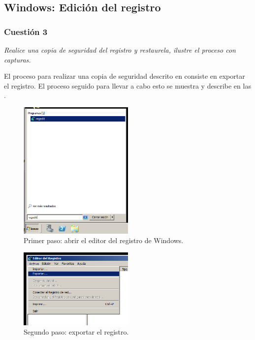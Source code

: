 \subsection{Windows: Edición del registro}
\subsubsection{Cuestión 3}
\textit{Realice una copia de seguridad del registro y restaurela, ilustre el proceso con capturas.}

El proceso para realizar una copia de seguridad descrito en consiste en exportar el registro. \cite{bac} El proceso seguido para llevar a cabo esto se muestra y describe en las .
\begin{figure}[H]
  \begin{center}
    \includegraphics[width=0.5\textwidth]{imagenes/1}
    \caption{Primer paso: abrir el editor del registro de Windows.}
    \label{fig1}
  \end{center}
\end{figure}

\begin{figure}[H]
  \begin{center}
    \includegraphics[width=0.5\textwidth]{imagenes/2}
    \caption{Segundo paso: exportar el registro.}
    \label{fig2}
  \end{center}
\end{figure}

